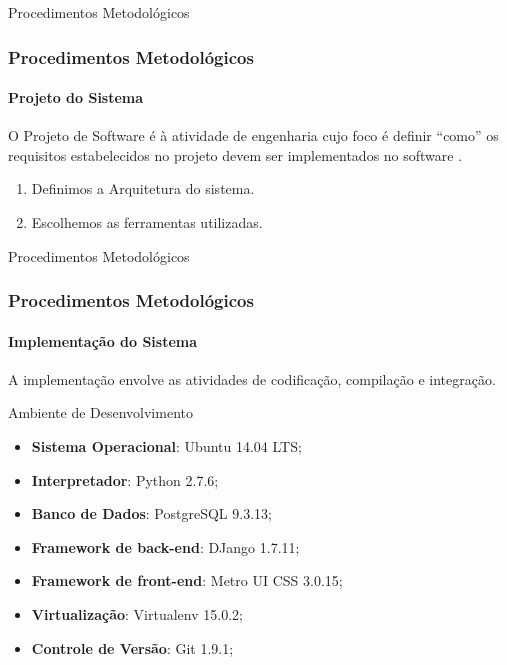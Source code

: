 \documentclass[aspectratio=169]{beamer}
\begin{document}

\begin{frame}{Procedimentos Metodológicos}
\frametitle{Procedimentos Metodológicos}
\framesubtitle{Projeto do Sistema}

O Projeto de Software é à atividade de engenharia cujo foco é definir ``como'' os requisitos estabelecidos no projeto devem ser implementados no software \cite{pressman2006engenharia}.
\pause
\begin{enumerate}
	\item Definimos a Arquitetura do sistema.
    \item Escolhemos as ferramentas utilizadas.
\end{enumerate}
\end{frame}


\begin{frame}{Procedimentos Metodológicos}
\frametitle{Procedimentos Metodológicos}
\framesubtitle{Implementação do Sistema}

A implementação envolve as atividades de codificação, compilação e integração.
\begin{block}{Ambiente de Desenvolvimento}
	 \begin{itemize}
	  \item \textbf{Sistema Operacional}: Ubuntu 14.04 LTS;
	  \item \textbf{Interpretador}: Python 2.7.6;
	  \item \textbf{Banco de Dados}: PostgreSQL 9.3.13;
	  \item \textbf{Framework de back-end}: DJango 1.7.11;
	  \item \textbf{Framework de front-end}: Metro UI CSS 3.0.15;
	  \item \textbf{Virtualiza\c{c}\~ao}: Virtualenv 15.0.2;
	  \item \textbf{Controle de Vers\~ao}: Git 1.9.1;
	 \end{itemize}

\end{block}


\end{frame}

\end{document}
